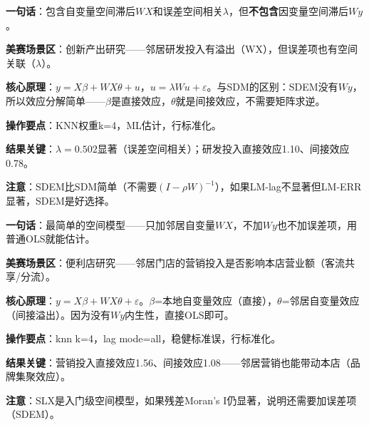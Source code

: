 
\begin{algobrief}
\textbf{一句话}：包含自变量空间滞后$WX$和误差空间相关$\lambda$，但\textbf{不包含}因变量空间滞后$Wy$。

\textbf{美赛场景区}：创新产出研究——邻居研发投入有溢出（WX），但误差项也有空间关联（$\lambda$）。

\textbf{核心原理}：$y=X\beta+WX\theta+u$，$u=\lambda Wu+\varepsilon$。与SDM的区别：SDEM没有$Wy$，所以效应分解简单——$\beta$是直接效应，$\theta$就是间接效应，不需要矩阵求逆。

\textbf{操作要点}：KNN权重k=4，ML估计，行标准化。

\textbf{结果关键}：$\lambda=0.502$显著（误差空间相关）；研发投入直接效应1.10、间接效应0.78。

\textbf{注意}：SDEM比SDM简单（不需要$(I-\rho W)^{-1}$），如果LM-lag不显著但LM-ERR显著，SDEM是好选择。
\end{algobrief}


\begin{algobrief}
\textbf{一句话}：最简单的空间模型——只加邻居自变量$WX$，不加$Wy$也不加误差项，用普通OLS就能估计。

\textbf{美赛场景区}：便利店研究——邻居门店的营销投入是否影响本店营业额（客流共享/分流）。

\textbf{核心原理}：$y=X\beta+WX\theta+\varepsilon$。$\beta$=本地自变量效应（直接），$\theta$=邻居自变量效应（间接溢出）。因为没有$Wy$内生性，直接OLS即可。

\textbf{操作要点}：knn k=4，lag mode=all，稳健标准误，行标准化。

\textbf{结果关键}：营销投入直接效应1.56、间接效应1.08——邻居营销也能带动本店（品牌集聚效应）。

\textbf{注意}：SLX是入门级空间模型，如果残差Moran's I仍显著，说明还需要加误差项（SDEM）。
\end{algobrief}
